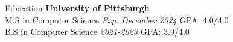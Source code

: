 \begin{rSection}{Education}
    {\bf University of Pittsburgh}\\
    M.S in Computer Science
    \hfill
    {\em Exp. December 2024}
    GPA: 4.0/4.0
    \\
    B.S in Computer Science
    \hfill
    {\em 2021-2023}
    GPA: 3.9/4.0
    
\end{rSection}
